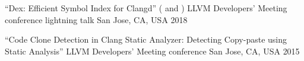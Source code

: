 
\begin{cventries}

  \cventry
    {``Dex: Efficient Symbol Index for Clangd''
     ( and
      )}
    {LLVM Developers' Meeting conference lightning talk}
    {San Jose, CA, USA}
    {2018}
    {}

  \cventry
    {``Code Clone Detection in Clang Static Analyzer: Detecting Copy-paste using
     Static Analysis''}
    {LLVM Developers' Meeting conference }
    {San Jose, CA, USA}
    {2015}
    {}

\end{cventries}
